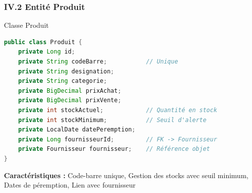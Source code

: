 \documentclass[11pt, aspectratio=169]{beamer}
\begin{document}
\begin{frame}
\begin{center}
    \end{center}
\end{frame}

\begin{frame}
    \frametitle{IV.2 Entité Produit}
    
    \begin{block}{Classe Produit}
        \begin{lstlisting}[language=Java]
public class Produit {
    private Long id;
    private String codeBarre;           // Unique
    private String designation;
    private String categorie;
    private BigDecimal prixAchat;
    private BigDecimal prixVente;
    private int stockActuel;            // Quantité en stock
    private int stockMinimum;           // Seuil d'alerte
    private LocalDate datePeremption;
    private Long fournisseurId;         // FK -> Fournisseur
    private Fournisseur fournisseur;    // Référence objet
}
        \end{lstlisting}
    \end{block}
    
    \vspace{0.5cm}
    
    \begin{small}
        \textbf{Caractéristiques :} Code-barre unique, Gestion des stocks avec seuil minimum,
        Dates de péremption, Lien avec fournisseur
    \end{small}
\end{frame}
\end{document}
